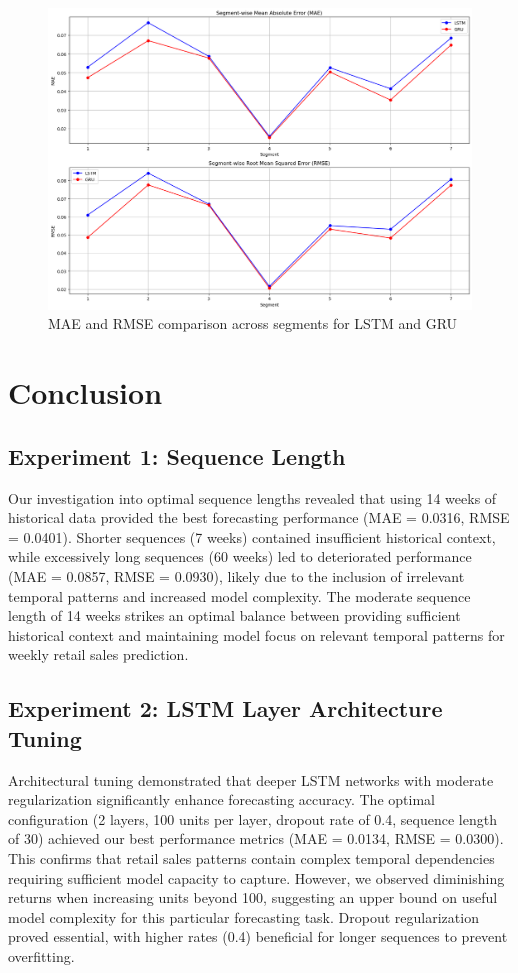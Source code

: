 \documentclass[conference]{IEEEtran}
\begin{document}
\begin{figure}[H]
\centering
\includegraphics[width=0.95\linewidth]{segment_wise_errors.png}
\caption{MAE and RMSE comparison across segments for LSTM and GRU}
\label{fig:segment_analysis}
\end{figure}


\section{Conclusion}

\subsection{Experiment 1: Sequence Length}
Our investigation into optimal sequence lengths revealed that using 14 weeks of historical data provided the best forecasting performance (MAE = 0.0316, RMSE = 0.0401). Shorter sequences (7 weeks) contained insufficient historical context, while excessively long sequences (60 weeks) led to deteriorated performance (MAE = 0.0857, RMSE = 0.0930), likely due to the inclusion of irrelevant temporal patterns and increased model complexity. The moderate sequence length of 14 weeks strikes an optimal balance between providing sufficient historical context and maintaining model focus on relevant temporal patterns for weekly retail sales prediction.

\subsection{Experiment 2: LSTM Layer Architecture Tuning}
Architectural tuning demonstrated that deeper LSTM networks with moderate regularization significantly enhance forecasting accuracy. The optimal configuration (2 layers, 100 units per layer, dropout rate of 0.4, sequence length of 30) achieved our best performance metrics (MAE = 0.0134, RMSE = 0.0300). This confirms that retail sales patterns contain complex temporal dependencies requiring sufficient model capacity to capture. However, we observed diminishing returns when increasing units beyond 100, suggesting an upper bound on useful model complexity for this particular forecasting task. Dropout regularization proved essential, with higher rates (0.4) beneficial for longer sequences to prevent overfitting.
\end{document}
